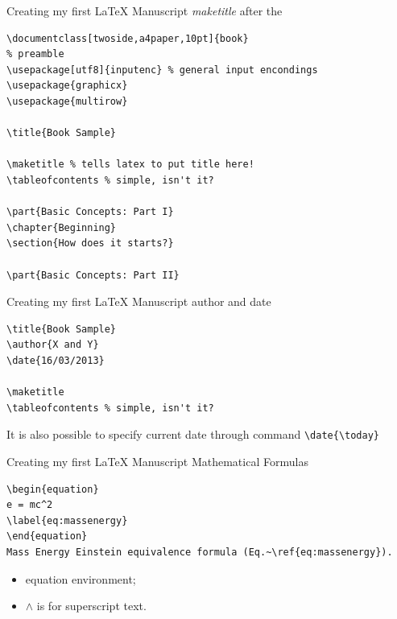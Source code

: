 \begin{frame}[fragile]{Creating my first \LaTeX{} Manuscript}
\emph{maketitle} after the \verb!!
\scriptsize
\begin{verbatim}
\documentclass[twoside,a4paper,10pt]{book}
% preamble
\usepackage[utf8]{inputenc} % general input encondings
\usepackage{graphicx}
\usepackage{multirow}

\title{Book Sample}

\maketitle % tells latex to put title here!
\tableofcontents % simple, isn't it?

\part{Basic Concepts: Part I}
\chapter{Beginning}
\section{How does it starts?}

\part{Basic Concepts: Part II}

\end{verbatim}
\end{frame}

\begin{frame}[fragile]{Creating my first \LaTeX{} Manuscript}
author and date
\scriptsize
\begin{verbatim}
\title{Book Sample}
\author{X and Y}
\date{16/03/2013}

\maketitle
\tableofcontents % simple, isn't it?
\end{verbatim}
\normalsize
It is also possible to specify current date through command \verb!\date{\today}!
\end{frame}


\begin{frame}[fragile]{Creating my first \LaTeX{} Manuscript}
Mathematical Formulas
\scriptsize
\begin{verbatim}
\begin{equation}
e = mc^2
\label{eq:massenergy}
\end{equation}
Mass Energy Einstein equivalence formula (Eq.~\ref{eq:massenergy}).
\end{verbatim}
\begin{itemize}
\item equation environment;
\item $\wedge$ is for superscript text.
\end{itemize}
\end{frame}


